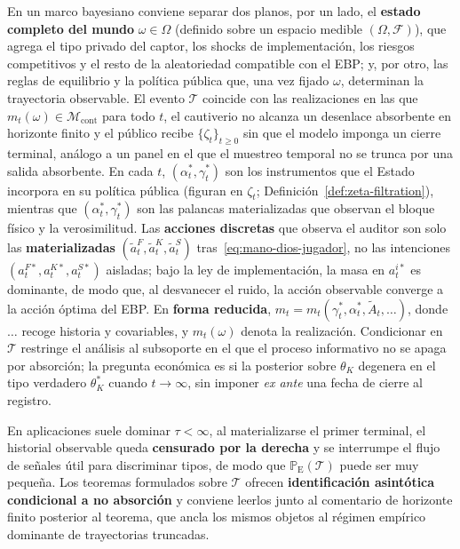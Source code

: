 \documentclass[12pt]{article}
\theoremstyle{definition}
\theoremstyle{remark}
\newcommand{\ProbE}{\mathbb{P}_{\mathrm{E}}}
\newcommand{\1}{\mathbf{1}}
\begin{document}
En un marco bayesiano conviene separar dos planos, por un lado, el \textbf{estado completo del mundo} $\omega\in\Omega$ \textup{(}definido sobre un espacio medible $(\Omega,\mathcal{F})$\textup{)}, que agrega el tipo privado del captor, los shocks de implementación, los riesgos competitivos y el resto de la aleatoriedad compatible con el EBP; y, por otro, las reglas de equilibrio y la política pública que, una vez fijado $\omega$, determinan la trayectoria observable. El evento $\mathcal{T}$ coincide con las realizaciones en las que $m_t(\omega)\in\mathcal{M}_{\mathrm{cont}}$ para todo $t$, el cautiverio no alcanza un desenlace absorbente en horizonte finito y el público recibe $\{\zeta_t\}_{t\ge 0}$ sin que el modelo imponga un cierre terminal, análogo a un panel en el que el muestreo temporal no se trunca por una salida absorbente. En cada $t$, $(\alpha_t^\ast,\gamma_t^\ast)$ son los instrumentos que el Estado incorpora en su política pública \textup{(}figuran en $\zeta_t$; Definición~\ref{def:zeta-filtration}\textup{)}, mientras que $(\alpha_t^\ast,\gamma_t^\ast)$ son las palancas materializadas que observan el bloque físico y la verosimilitud. Las \textbf{acciones discretas} que observa el auditor son solo las \textbf{materializadas} $(\tilde{a}_t^F,\tilde{a}_t^K,\tilde{a}_t^S)$ tras~\eqref{eq:mano-dios-jugador}, no las intenciones $(a_t^{F\ast},a_t^{K\ast},a_t^{S\ast})$ aisladas; bajo la ley de implementación, la masa en $a_t^{i\ast}$ es dominante, de modo que, al desvanecer el ruido, la acción observable converge a la acción óptima del EBP. En \textbf{forma reducida}, $m_t=m_t(\gamma_t^\ast,\alpha_t^\ast,\tilde{A}_t,\ldots)$, donde $\ldots$ recoge historia y covariables, y $m_t(\omega)$ denota la realización. Condicionar en $\mathcal{T}$ restringe el análisis al subsoporte en el que el proceso informativo no se apaga por absorción; la pregunta económica es si la posterior sobre $\theta_K$ degenera en el tipo verdadero $\theta_K^\ast$ cuando $t\to\infty$, sin imponer \textit{ex ante} una fecha de cierre al registro.

En aplicaciones suele dominar $\tau<\infty$, al materializarse el primer terminal, el historial observable queda \textbf{censurado por la derecha} y se interrumpe el flujo de señales útil para discriminar tipos, de modo que $\ProbE(\mathcal{T})$ puede ser muy pequeña. Los teoremas formulados sobre $\mathcal{T}$ ofrecen \textbf{identificación asintótica condicional a no absorción} y conviene leerlos junto al comentario de horizonte finito posterior al teorema, que ancla los mismos objetos al régimen empírico dominante de trayectorias truncadas.
\end{document}
